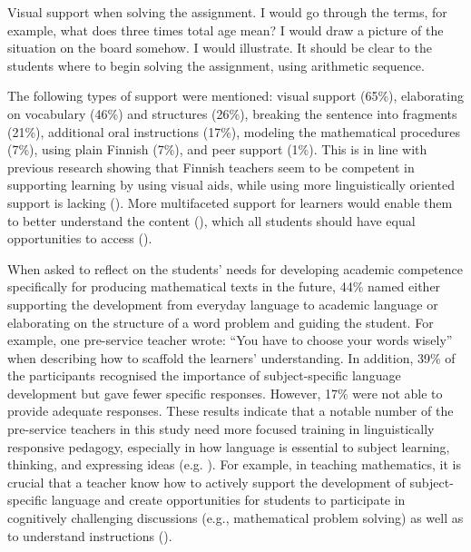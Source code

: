 \documentclass[output=paper]{langscibook}
\begin{document}
\ea Visual support when solving the assignment. I would go through the terms, for example, what does three times total age mean? 
\ex I would draw a picture of the situation on the board somehow. I would illustrate. 
\ex  It should be clear to the students where to begin solving the assignment, using arithmetic sequence. 
\z

The following types of support were mentioned: visual support (65\%), elaborating on vocabulary (46\%) and structures (26\%), breaking the sentence into fragments (21\%), additional oral instructions (17\%), modeling the mathematical procedures (7\%), using plain Finnish (7\%), and peer support (1\%). This is in line with previous research showing that Finnish teachers seem to be competent in supporting learning by using visual aids, while using more linguistically oriented support is lacking (\citealt{HeikkolaEtAl2022}). More multifaceted support for learners would enable them to better understand the content (\citealt{Gibbons2014}), which all students should have equal opportunities to access (\citealt{ComminsMiramontes2006}).

When asked to reflect on the students’ needs for developing academic competence specifically for producing mathematical texts in the future, 44\% named either supporting the development from everyday language to academic language or elaborating on the structure of a word problem and guiding the student. For example, one pre-service teacher wrote: “You have to choose your words wisely” when describing how to scaffold the learners’ understanding. In addition, 39\% of the participants recognised the importance of subject-specific language development but gave fewer specific responses. However, 17\% were not able to provide adequate responses. These results indicate that a notable number of the pre-service teachers in this study need more focused training in linguistically responsive pedagogy, especially in how language is essential to subject learning, thinking, and expressing ideas (e.g. \citealt{CumminsEarly2015,ShanahanShanahan2008}). For example, in teaching mathematics, it is crucial that a teacher know how to actively support the development of subject-specific language and create opportunities for students to participate in cognitively challenging discussions (e.g., mathematical problem solving) as well as to understand instructions (\citealt{AhlholmPortaankorva-Koivisto2018,CarlsonEtAl2018,JoutsenlahtiTossavainen2018}).
\end{document}
